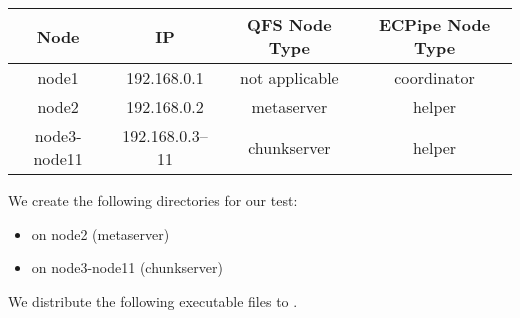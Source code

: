 \documentclass[letterpaper,12pt]{article}
\begin{document}
\begin{center}
\begin{tabular}{|c|c|c|c|}
\hline
{\bf Node} & {\bf IP} & {\bf QFS Node Type} & {\bf ECPipe Node Type} \\
\hline
node1 &192.168.0.1& not applicable & coordinator \\
\hline
node2 &192.168.0.2& metaserver & helper \\
\hline
node3-node11& 192.168.0.3--11 & chunkserver & helper \\
\hline
\end{tabular}
\end{center}

We create the following directories for our test:

\begin{itemize}

\item on node2 (metaserver)

\begin{center}
\noindent{}
\end{center}

\item on node3-node11 (chunkserver)

\begin{center}
\noindent{}
\end{center}

\end{itemize}

We distribute the following executable files to .

\begin{center}
\noindent{}
\end{center}
\end{document}
